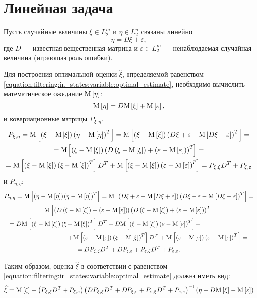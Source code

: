 \section{Линейная задача}

Пусть случайные величины $\xi \in L_2^m$ и $\eta \in L_2^n$ связаны линейно:
$$
	\eta = D \xi + \varepsilon ,
$$
где $D$ --- известная вещественная матрица и $\varepsilon \in L_2^m$ --- ненаблюдаемая случайная величина (играющая роль ошибки).

Для построения оптимальной оценки $\widehat{\xi}$, определяемой равенством \eqref{equation:filtering:in_states:variable:optimal_estimate}, необходимо вычислить математическое ожидание
$\mathrm{M} \left [ \eta \right ]$:
$$
	\mathrm{M} \left [ \eta \right ] = D \mathrm{M} \left [ \xi \right ] + \mathrm{M} \left [ \varepsilon \right ] ,
$$
и ковариационные матрицы $P_{\xi, \eta}$:
\begin{multline*}
	P_{\xi,\eta}
		= \mathrm{M} \left [ \left ( \xi - \mathrm{M} \left [ \xi \right ] \right ) \left ( \eta - \mathrm{M} \left [ \eta \right ] \right )^T \right ]
		= \mathrm{M} \left [ \left ( \xi - \mathrm{M} \left [ \xi \right ] \right ) \left ( D \xi + \varepsilon - \mathrm{M} \left [ D \xi + \varepsilon \right ] \right )^T \right ] = \\
	= \mathrm{M} \left [ \left ( \xi - \mathrm{M} \left [ \xi \right ] \right ) \left ( D \left ( \xi - \mathrm{M} \left [ \xi \right ] \right ) + \left ( \varepsilon - \mathrm{M} \left [ \varepsilon \right ] \right ) \right )^T  \right ] = \\
	= \mathrm{M} \left [ \left ( \xi - \mathrm{M} \left [ \xi \right ] \right ) \left ( \xi - \mathrm{M} \left [ \xi \right ] \right )^T \right ] D^T + \mathrm{M} \left [ \left ( \xi - \mathrm{M} \left [ \xi \right ] \right ) \left ( \varepsilon - \mathrm{M} \left [ \varepsilon \right ] \right )^T \right ]
		= P_{\xi, \xi} D^T + P_{\xi, \varepsilon}
\end{multline*}
и $P_{\eta, \eta}$:
\begin{multline*}
	P_{\eta, \eta}
		= \outerexpectation{\eta}{\eta}
		= \outerexpectation{D \xi + \varepsilon}{D \xi + \varepsilon} = \\
	= \expectation{\left ( D \left ( \xi - \expectation{\xi} \right ) + \left ( \varepsilon - \expectation{\varepsilon} \right ) \right ) \left ( D \left ( \xi - \expectation{\xi} \right ) + \left ( \varepsilon - \expectation{\varepsilon} \right ) \right )^T} = \\
	\shoveleft {
		= D \outerexpectation{\xi}{\xi} D^T + D \outerexpectation{\xi}{\varepsilon} +
	} \\
	\shoveright{
		+ \outerexpectation{\varepsilon}{\xi} D^T + \outerexpectation{\varepsilon}{\varepsilon}
		=
	} \\
	= D P_{\xi, \xi} D^T + D P_{\xi, \varepsilon} + P_{\varepsilon, \xi} D^T + P_{\varepsilon, \varepsilon}.
\end{multline*}

Таким образом, оценка $\widehat{\xi}$ в соответствии с равенством \eqref{equation:filtering:in_states:variable:optimal_estimate} должна иметь вид:
\begin{equation} \label{equation:filtering:in_states:variable:linear_observations:optimal_estimate}
	\widehat{\xi}
	= \mathrm{M} \left [ \xi \right ]
	+ \left ( P_{\xi, \xi} D^T + P_{\xi, \varepsilon} \right )
		\left ( D P_{\xi, \xi} D^T + D P_{\xi, \varepsilon} + P_{\varepsilon, \xi} D^T + P_{\varepsilon, \varepsilon} \right )^{-1}
		\left ( \eta - D \mathrm{M} \left [ \xi \right ] - \mathrm{M} \left [ \varepsilon \right ] \right )
\end{equation}

